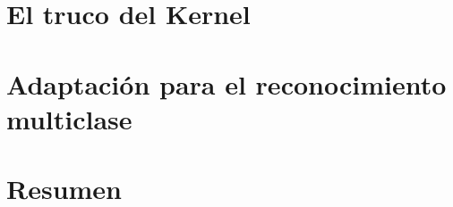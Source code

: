 \section{El truco del Kernel}


\section{Adaptación para el reconocimiento multiclase}

\section{Resumen}

